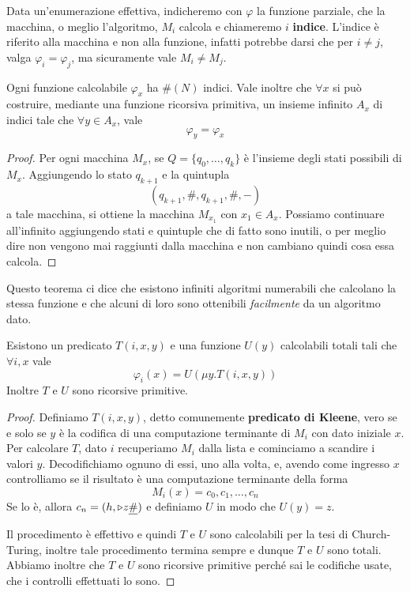 Data un'enumerazione effettiva, indicheremo con $\varphi$ la
funzione parziale, che la macchina, o meglio l'algoritmo, $M_i$
calcola e chiameremo $i$ \textbf{indice}. L'indice è riferito
alla macchina e non alla funzione, infatti potrebbe darsi che
per $i \neq j$, valga $\varphi_i = \varphi_j$, ma sicuramente
vale $M_i \neq M_j$.

\begin{theorem} \label{th: padding lemma}
	Ogni funzione calcolabile $\varphi_x$ ha $\# (N)$ indici.
	Vale inoltre che $\forall x$ si può costruire, mediante una
	funzione ricorsiva primitiva, un insieme infinito $A_x$ di
	indici tale che $\forall y \in A_x$, vale
	\[ \varphi_y = \varphi_x \]
	\begin{proof}
		Per ogni macchina $M_x$, se $Q = \{ q_0, \dots, q_k \}$
		è l'insieme degli stati possibili di $M_x$. Aggiungendo
		lo stato $q_{k+1}$ e la quintupla
		\[ (q_{k+1}, \#, q_{k+1}, \#, -) \]
		a tale macchina, si ottiene la macchina $M_{x_1}$ con
		$x_1 \in A_x$. Possiamo continuare all'infinito
		aggiungendo stati e quintuple che di fatto sono inutili,
		o per meglio dire non vengono mai raggiunti dalla
		macchina e non cambiano quindi cosa essa calcola.
	\end{proof}
\end{theorem}

Questo teorema ci dice che esistono infiniti algoritmi
numerabili che calcolano la stessa funzione e che alcuni di
loro sono ottenibili \emph{facilmente} da un algoritmo dato.

\begin{theorem} \label{th: fn}
	Esistono un predicato $T(i, x, y)$ e una funzione $U(y)$
	calcolabili totali tali che $\forall i,x$ vale
	\[ \varphi_i(x) = U(\mu y . T (i, x, y)) \]
	Inoltre $T$ e $U$ sono ricorsive primitive.
	\begin{proof}
		Definiamo $T(i,x,y)$, detto comunemente
		\textbf{predicato di Kleene}, vero se e solo se $y$ è
		la codifica di una computazione terminante di $M_i$
		con dato iniziale $x$. Per calcolare $T$, dato $i$
		recuperiamo $M_i$ dalla lista e cominciamo a scandire
		i valori $y$. Decodifichiamo ognuno di essi, uno alla
		volta, e, avendo come ingresso $x$ controlliamo se il
		risultato è una computazione terminante della forma
		\[ M_i(x) = c_0, c_1, \dots, c_n \]
		Se lo è, allora $c_n = (h, \triangleright z \underline{\#})$ e
		definiamo $U$ in modo che $U(y) = z$.

		Il procedimento è effettivo e quindi $T$ e $U$ sono
		calcolabili per la tesi di Church-Turing, inoltre tale
		procedimento termina sempre e dunque $T$ e $U$ sono
		totali. Abbiamo inoltre che $T$ e $U$ sono ricorsive
		primitive perché sai le codifiche usate, che i controlli
		effettuati lo sono.
	\end{proof}
\end{theorem}

